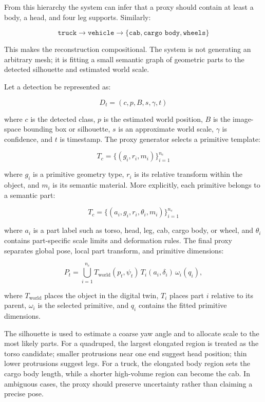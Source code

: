 ﻿\documentclass[11pt,a4paper]{article}
\begin{document}
From this hierarchy the system can infer that a proxy should contain at least a
body, a head, and four leg supports. Similarly:

\[
\texttt{truck} \rightarrow \texttt{vehicle} \rightarrow
\{\texttt{cab}, \texttt{cargo body}, \texttt{wheels}\}
\]

This makes the reconstruction compositional. The system is not generating an
arbitrary mesh; it is fitting a small semantic graph of geometric parts to the
detected silhouette and estimated world scale.

Let a detection be represented as:

\[
D_t = (c, p, B, s, \gamma, t)
\]

where \(c\) is the detected class, \(p\) is the estimated world position, \(B\)
is the image-space bounding box or silhouette, \(s\) is an approximate world
scale, \(\gamma\) is confidence, and \(t\) is timestamp. The proxy generator
selects a primitive template:

\[
T_c = \{(g_i, r_i, m_i)\}_{i=1}^{n_c}
\]

where \(g_i\) is a primitive geometry type, \(r_i\) is its relative transform
within the object, and \(m_i\) is its semantic material. More explicitly, each
primitive belongs to a semantic part:

\[
T_c = \{(a_i, g_i, r_i, \theta_i, m_i)\}_{i=1}^{n_c}
\]

where \(a_i\) is a part label such as torso, head, leg, cab, cargo body, or
wheel, and \(\theta_i\) contains part-specific scale limits and deformation
rules. The final proxy separates global pose, local part transform, and
primitive dimensions:

\[
P_t =
\bigcup_{i=1}^{n_c}
T_{\mathrm{world}}(p_t,\psi_t)\,
T_i(a_i,\delta_i)\,
\omega_i(q_i),
\]

where \(T_{\mathrm{world}}\) places the object in the digital twin,
\(T_i\) places part \(i\) relative to its parent, \(\omega_i\) is the selected
primitive, and \(q_i\) contains the fitted primitive dimensions.

The silhouette is used to estimate a coarse yaw angle and to allocate scale to
the most likely parts. For a quadruped, the largest elongated region is treated
as the torso candidate; smaller protrusions near one end suggest head position;
thin lower protrusions suggest legs. For a truck, the elongated body region
sets the cargo body length, while a shorter high-volume region can become the
cab. In ambiguous cases, the proxy should preserve uncertainty rather than
claiming a precise pose.
\end{document}
